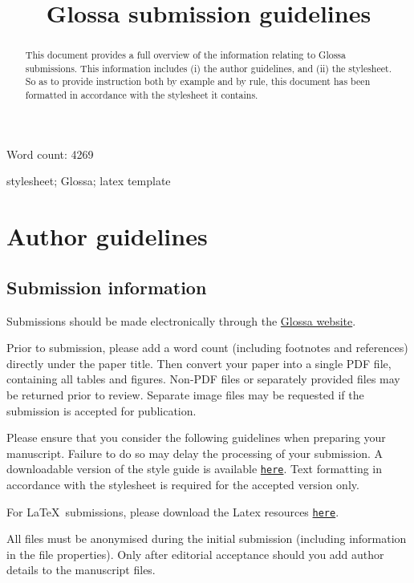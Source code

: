 \documentclass[charis,linguex]{glossa}
\title[Glossa guidelines]{Glossa submission guidelines}
\author[Paul \& Vanden Wyngaerd]%
{%
  \spauthor{Waltraud Paul\\ 
  \institute{CRLAO, CNRS-EHESS-INALCO}\\
  \small{%
  waltraud.paul@ehess.fr}
  }
  \AND
  \spauthor{Guido Vanden Wyngaerd \\
  \institute{KU Leuven}\\
  \small{%
  guido.vandenwyngaerd@kuleuven.be}
  }%
}
\begin{document}
\sffamily
\maketitle

Word count: 4269

\begin{abstract}
This document provides a full overview of the information relating to Glossa submissions. This information includes (i) the author guidelines, and (ii) the stylesheet. So as to provide instruction both by example and by rule, this document has been formatted in accordance with the stylesheet it contains.
\end{abstract}

\begin{keywords}
  stylesheet; Glossa; latex template
\end{keywords}

\rmfamily


\section{Author guidelines}
\subsection{Submission information}

Submissions should be made electronically through the \href{http://glossa.ubiquitypress.com}{Glossa website}. 

Prior to submission, please add a word count (including footnotes and references) directly under the paper title. Then convert your paper into a single PDF file, containing all tables and figures. Non-PDF files or separately provided files may be returned prior to review. Separate image files may be requested if the submission is accepted for publication.

Please ensure that you consider the following guidelines when preparing your manuscript. Failure to do so may delay the processing of your submission. A downloadable version of the style guide is available \href{https://github.com/guidovw/Glossalatex/blob/master/glossa-template.pdf}{\texttt{here}}. Text formatting in accordance with  the stylesheet is required for the accepted version only.


For \LaTeX\ submissions, please download the Latex resources \href{https://github.com/guidovw/Glossalatex}{\texttt{here}}.

All files must be anonymised during the initial submission (including information in the file properties). Only after editorial acceptance should you add author details to the manuscript files. 
\end{document}
